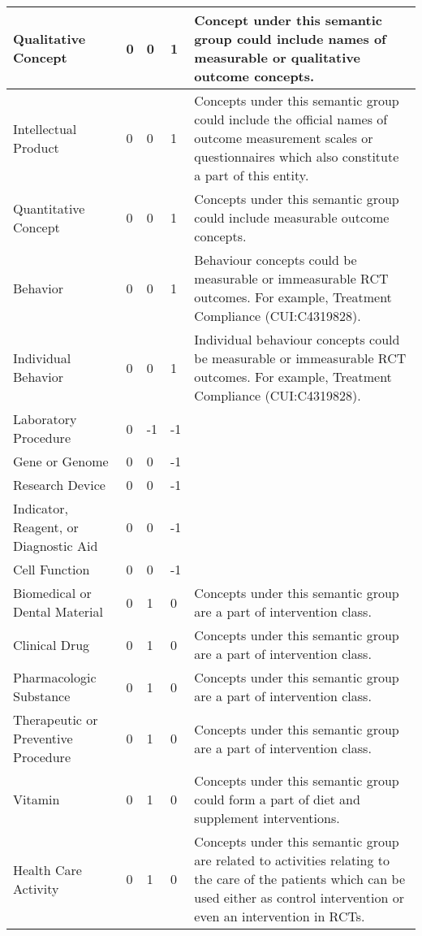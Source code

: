 \documentclass[10.7pt,]{article}
\begin{document}
\begin{longtable}{|l|p{0.3cm}|p{0.3cm}|p{0.3cm}|p{7.9cm}|}
        Qualitative Concept & 0 & 0 & 1 & Concept under this semantic group could include names of measurable or qualitative outcome concepts. \\ \hline
        Intellectual Product & 0 & 0 & 1 & Concepts under this semantic group could include the official names of outcome measurement scales or questionnaires which also constitute a part of this entity. \\ \hline
        Quantitative Concept & 0 & 0 & 1 & Concepts under this semantic group could include measurable outcome concepts. \\ \hline
        Behavior & 0 & 0 & 1 & Behaviour concepts could be measurable or immeasurable RCT outcomes. For example, Treatment Compliance (CUI:C4319828). \\ \hline
        Individual Behavior & 0 & 0 & 1 & Individual behaviour concepts could be measurable or immeasurable RCT outcomes. For example, Treatment Compliance (CUI:C4319828). \\ \hline
        Laboratory Procedure & 0 & -1 & -1 & ~ \\ \hline
        Gene or Genome & 0 & 0 & -1 & ~ \\ \hline
        Research Device & 0 & 0 & -1 & ~ \\ \hline
        Indicator, Reagent, or Diagnostic Aid & 0 & 0 & -1 & ~ \\ \hline
        Cell Function & 0 & 0 & -1 & ~ \\ \hline
        Biomedical or Dental Material & 0 & 1 & 0 & Concepts under this semantic group are a part of intervention class. \\ \hline
        Clinical Drug & 0 & 1 & 0 & Concepts under this semantic group are a part of intervention class. \\ \hline
        Pharmacologic Substance & 0 & 1 & 0 & Concepts under this semantic group are a part of intervention class. \\ \hline
        Therapeutic or Preventive Procedure & 0 & 1 & 0 & Concepts under this semantic group are a part of intervention class. \\ \hline
        Vitamin & 0 & 1 & 0 & Concepts under this semantic group could form a part of diet and supplement interventions. \\ \hline
        Health Care Activity & 0 & 1 & 0 & Concepts under this semantic group are related to activities relating to the care of the patients which can be used either as control intervention or even an intervention in RCTs. \\ \hline

\end{longtable}
\end{document}
